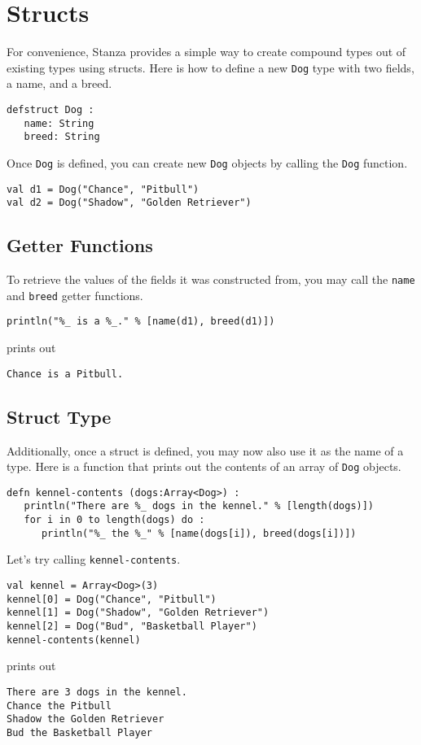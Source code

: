 \documentclass[10pt,oneside]{book}
\begin{document}
\section{Structs}
For convenience, Stanza provides a simple way to create compound types out of existing types using structs. Here is how to define a new \texttt{\frenchspacing Dog} type with two fields, a name, and a breed.
\begin{lstlisting}
defstruct Dog :
   name: String
   breed: String
\end{lstlisting}

Once \texttt{\frenchspacing Dog} is defined, you can create new \texttt{\frenchspacing Dog} objects by calling the \texttt{\frenchspacing Dog} function.
\begin{lstlisting}
val d1 = Dog("Chance", "Pitbull")
val d2 = Dog("Shadow", "Golden Retriever")
\end{lstlisting}

\subsection*{Getter Functions}
To retrieve the values of the fields it was constructed from, you may call the \texttt{\frenchspacing name} and \texttt{\frenchspacing breed} getter functions.
\begin{lstlisting}
println("%_ is a %_." % [name(d1), breed(d1)])
\end{lstlisting}
prints out
\begin{lstlisting}
Chance is a Pitbull.
\end{lstlisting}

\subsection*{Struct Type}
Additionally, once a struct is defined, you may now also use it as the name of a type. Here is a function that prints out the contents of an array of \texttt{\frenchspacing Dog} objects.
\begin{lstlisting}
defn kennel-contents (dogs:Array<Dog>) :
   println("There are %_ dogs in the kennel." % [length(dogs)])
   for i in 0 to length(dogs) do :
      println("%_ the %_" % [name(dogs[i]), breed(dogs[i])])
\end{lstlisting}
Let's try calling \texttt{\frenchspacing kennel-contents}.
\begin{lstlisting}
val kennel = Array<Dog>(3)
kennel[0] = Dog("Chance", "Pitbull")
kennel[1] = Dog("Shadow", "Golden Retriever")
kennel[2] = Dog("Bud", "Basketball Player")
kennel-contents(kennel)
\end{lstlisting}
prints out
\begin{lstlisting}
There are 3 dogs in the kennel.
Chance the Pitbull
Shadow the Golden Retriever
Bud the Basketball Player
\end{lstlisting}
\end{document}
